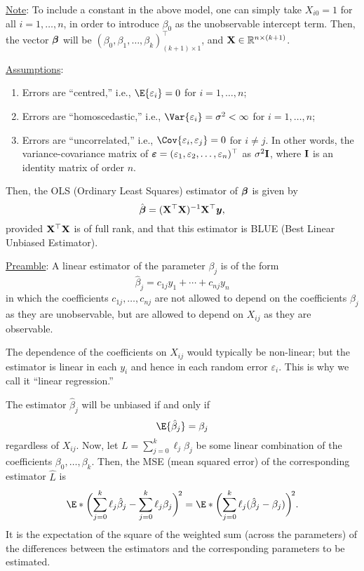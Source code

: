 \underline{Note}: To include a constant in the above model,
one can simply take $ X_{i0}=1 $ for all $ i=1,\ldots,n $,
in order to introduce $ \beta_0 $ as the unobservable intercept term.
Then, the vector $ {\boldsymbol \beta} $ will be
$ (\beta_0,\beta_1,\ldots,\beta_k)^\top_{(k+1)\times 1} $, and
$ \mathbf{X}\in\mathbb{R}^{n\times(k+1)} $.

\underline{Assumptions}:
\begin{enumerate}[(1)]
    \item Errors are ``centred,'' i.e., $ \E{\varepsilon_i}=0 $ for $ i=1,\ldots,n $;
    \item Errors are ``homoscedastic,'' i.e., $ \Var{\varepsilon_i}=\sigma^2<\infty $
          for $ i=1,\ldots,n $;
    \item Errors are ``uncorrelated,'' i.e., $ \Cov{\varepsilon_i,\varepsilon_j}=0 $
          for $ i\ne j $. In other words, the variance-covariance matrix of
          $ {\boldsymbol \varepsilon}=(\varepsilon_1,\varepsilon_2,\ldots,\varepsilon_n)^\top $
          as $ \sigma^2 \mathbf{I} $, where $ \mathbf{I} $ is an identity matrix of order $ n $.
\end{enumerate}
Then, the OLS (Ordinary Least Squares) estimator of $ {\boldsymbol \beta} $
is given by
\[ \hat{{\boldsymbol \beta}}=(\mathbf{X}^\top \mathbf{X})^{-1}\mathbf{X}^\top {\boldsymbol y}, \]
provided $ \mathbf{X}^\top \mathbf{X} $ is of full rank, and that this estimator
is BLUE (Best Linear Unbiased Estimator).

\underline{Preamble}: A linear estimator of the parameter $ \beta_j $
is of the form
\[ \hat{\beta}_j=c_{1j}y_1+\cdots+c_{nj}y_n \]
in which the coefficients $ c_{1j},\ldots,c_{nj} $ are
not allowed to depend on the coefficients $ \beta_j $
as they are unobservable, but are allowed to depend on $ X_{ij} $
as they are observable.

The dependence of the coefficients on $ X_{ij} $ would typically be non-linear;
but the estimator is linear in each $ y_i $ and hence in each random
error $ \varepsilon_i $. This is why we call it ``linear regression.''

The estimator $ \hat{\beta}_j $ will be unbiased if and only if
\[ \E{\hat{\beta}_j}=\beta_j \]
regardless of $ X_{ij} $. Now, let $ L=\sum_{j=0}^{k}\ell_j\beta_j $
be some linear combination of the coefficients $ \beta_0,\ldots,\beta_k $.
Then, the MSE (mean squared error) of the corresponding estimator $ \hat{L} $
is
\[ \E*{\biggl(\sum_{j=0}^{k}\ell_j\hat{\beta}_j-\sum_{j=0}^{k}\ell_j\beta_j\biggr)^{\!2}}
    =\E*{\biggl(\sum_{j=0}^{k}\ell_j(\hat{\beta}_j-\beta_j)\biggr)^{\!2}}. \]
It is the expectation of the square of the weighted sum (across the parameters)
of the differences between the estimators and the corresponding parameters
to be estimated.

